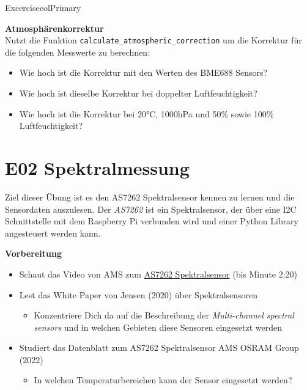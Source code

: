 \documentclass[
  11pt,
  a4paper,
  oneside, openany  ,captions=tableheading
]{scrbook}
\providecommand{\tightlist}{%
  \setlength{\itemsep}{0pt}\setlength{\parskip}{0pt}}
\theoremstyle{remark}
\begin{document}
\begin{boxtitle}{Excercise}{colPrimary}

\textbf{Atmosphärenkorrektur}\\
Nutzt die Funktion \texttt{calculate\_atmospheric\_correction} um die
Korrektur für die folgenden Messwerte zu berechnen:

\begin{itemize}
\tightlist
\item
  Wie hoch ist die Korrektur mit den Werten des BME688 Sensors?
\item
  Wie hoch ist dieselbe Korrektur bei doppelter Luftfeuchtigkeit?
\item
  Wie hoch ist die Korrektur bei 20°C, 1000hPa und 50\% sowie 100\%
  Luftfeuchtigkeit?
\end{itemize}

\end{boxtitle}

\chapter*{E02 Spektralmessung}\label{e02-spektralmessung}


Ziel dieser Übung ist es den AS7262 Spektralsensor kennen zu lernen und
die Sensordaten auszulesen. Der \emph{AS7262} ist ein Spektralsensor,
der über eine I2C Schnittstelle mit dem Raspberry Pi verbunden wird und
einer Python Library angesteuert werden kann.

\textbf{Vorbereitung}

\begin{itemize}
\tightlist
\item
  Schaut das Video von AMS zum
  \href{https://www.youtube.com/embed/KKyHxXyaVPM?si=hvO1IVbdwbjnDI40}{AS7262
  Spektralsensor} (bis Minute 2:20)
\item
  Lest das White Paper von Jensen (2020) über Spektralsensoren

  \begin{itemize}
  \tightlist
  \item
    Konzentriere Dich da auf die Beschreibung der \emph{Multi-channel
    spectral sensors} und in welchen Gebieten diese Sensoren eingesetzt
    werden
  \end{itemize}
\item
  Studiert das Datenblatt zum AS7262 Spektralsensor AMS OSRAM Group
  (2022)

  \begin{itemize}
  \tightlist
  \item
    In welchen Temperaturbereichen kann der Sensor eingesetzt werden?
  \end{itemize}
\end{itemize}
\end{document}
